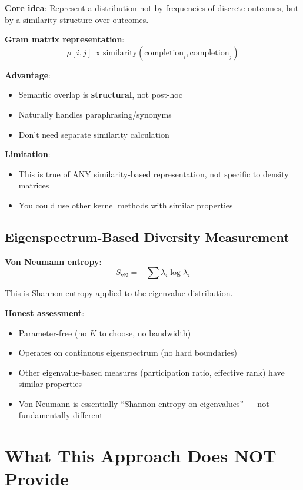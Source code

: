 \documentclass[11pt]{article}
\newcommand{\cmark}{✓}
\newcommand{\wmark}{⚠}
\begin{document}
\textbf{Core idea}: Represent a distribution not by frequencies of discrete outcomes, but by a similarity structure over outcomes.

\textbf{Gram matrix representation}:
$$\rho[i,j] \propto \text{similarity}(\text{completion}_i, \text{completion}_j)$$

\textbf{Advantage}:
\begin{itemize}
\item[\cmark] Semantic overlap is \textbf{structural}, not post-hoc
\item[\cmark] Naturally handles paraphrasing/synonyms
\item[\cmark] Don't need separate similarity calculation
\end{itemize}

\textbf{Limitation}:
\begin{itemize}
\item[\wmark] This is true of ANY similarity-based representation, not specific to density matrices
\item[\wmark] You could use other kernel methods with similar properties
\end{itemize}

\subsection{Eigenspectrum-Based Diversity Measurement}

\textbf{Von Neumann entropy}:
$$S_{\text{vN}} = -\sum \lambda_i \log \lambda_i$$

This is Shannon entropy applied to the eigenvalue distribution.

\textbf{Honest assessment}:
\begin{itemize}
\item[\cmark] Parameter-free (no $K$ to choose, no bandwidth)
\item[\cmark] Operates on continuous eigenspectrum (no hard boundaries)
\item[\wmark] Other eigenvalue-based measures (participation ratio, effective rank) have similar properties
\item[\wmark] Von Neumann is essentially ``Shannon entropy on eigenvalues'' --- not fundamentally different
\end{itemize}

\section{What This Approach Does NOT Provide}
\end{document}
